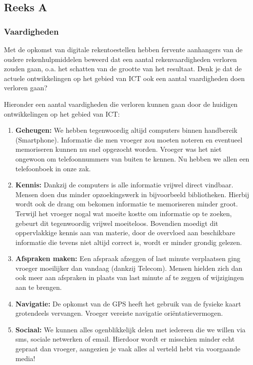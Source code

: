 \documentclass[../main.tex]{subfiles}
\begin{document}
\subsection{Reeks A}

\subsubsection{Vaardigheden}
\begin{question}Met de opkomst van digitale rekentoestellen hebben fervente aanhangers van de oudere rekenhulpmiddelen beweerd dat een aantal rekenvaardigheden verloren zouden gaan, o.a. het schatten van de grootte van het resultaat. Denk je dat de actuele ontwikkelingen op het gebied van ICT ook een aantal vaardigheden doen verloren gaan?
\end{question}

\begin{solution}
	Hieronder een aantal vaardigheden die verloren kunnen gaan door de huidigen ontwikkelingen op het gebied van ICT:
	\begin{enumerate}
		\item \textbf{Geheugen:} We hebben tegenwoordig altijd computers binnen handbereik (Smartphone). Informatie die men vroeger zou moeten noteren en eventueel memoriseren kunnen nu snel opgezocht worden. Vroeger was het niet ongewoon
		om telefoonnummers van buiten te kennen. Nu hebben we allen een telefoonboek in onze zak.
		\item \textbf{Kennis:} Dankzij de computers is alle informatie vrijwel direct vindbaar. Mensen doen dus minder opzoekingswerk in bijvoorbeeld bibliotheken. Hierbij wordt ook de drang om bekomen informatie te memoriseren minder groot.
		Terwijl het vroeger nogal wat moeite kostte om informatie op te zoeken, gebeurt dit tegenwoordig vrijwel moeiteloos. Bovendien moedigt dit oppervlakkige kennis aan van materie, door de overvloed aan beschikbare informatie die tevens niet altijd correct is, wordt er minder grondig gelezen.
		\item \textbf{Afspraken maken:} Een afspraak afzeggen of last minute verplaatsen ging vroeger moeilijker dan vandaag (dankzij Telecom). Mensen hielden zich dan ook meer aan afspraken in plaats van last minute af te zeggen of wijzigingen aan te brengen.
		\item \textbf{Navigatie:} De opkomst van de GPS heeft het gebruik van de fysieke kaart grotendeels vervangen. Vroeger vereiste navigatie ori\"entatievermogen.
		\item \textbf{Sociaal:} We kunnen alles ogenblikkelijk delen met iedereen die we willen via sms, sociale netwerken of email. Hierdoor wordt er misschien minder echt gepraat dan vroeger, aangezien je vaak alles al verteld hebt via voorgaande media!

	\end{enumerate}
\end{solution}
\end{document}
